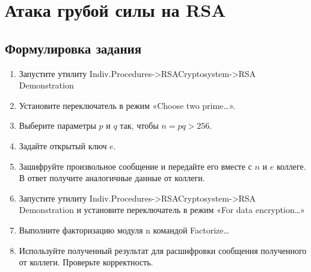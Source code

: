 \documentclass[a4paper, 14pt]{extarticle}
\begin{document}
\section{Атака грубой силы на RSA}
\subsection{Формулировка задания}
\begin{enumerate}
    \item Запустите утилиту Indiv.Procedures->RSACryptosystem->RSA Demonstration
    \item Установите переключатель в режим «Choose two prime…».
    \item Выберите параметры $p$ и $q$ так, чтобы $n=pq> 256$.
    \item Задайте открытый ключ $e$.
    \item Зашифруйте произвольное сообщение и передайте его вместе с $n$ и $e$ коллеге. В ответ получите аналогичные данные от коллеги.
    \item Запустите утилиту Indiv.Procedures->RSACryptosystem->RSA Demonstration и установите переключатель в режим «For data encryption…»
    \item Выполните факторизацию модуля n командой Factorize…
    \item Используйте полученный результат для расшифровки сообщения полученного от коллеги. Проверьте корректность.
\end{enumerate}
\end{document}
